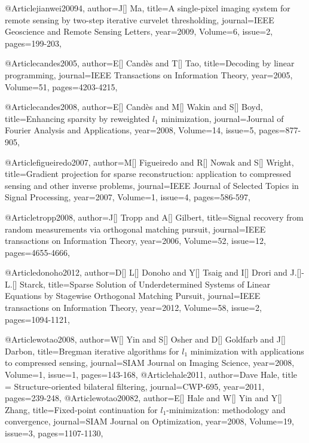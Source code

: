 @Article{jianwei20094,
  author={J[] Ma},
  title={A single-pixel imaging system for remote sensing by two-step iterative curvelet
thresholding},
  journal={IEEE Geoscience and Remote Sensing Letters},
  year=2009,
  Volume=6,
  issue=2,
  pages={199-203},
}

@Article{candes2005,
  author={E[] Cand\`{e}s and T[] Tao},
  title={Decoding by linear programming},
  journal={IEEE Transactions on Information Theory},
  year=2005,
  Volume=51,
  pages={4203-4215},
}

@Article{candes2008,
  author={E[] Cand\`{e}s and M[] Wakin and S[] Boyd},
  title={Enhancing sparsity by reweighted $l_1$ minimization},
  journal={Journal of {F}ourier Analysis and Applications},
  year=2008,
  Volume=14,
  issue=5,
  pages={877-905},
}

@Article{figueiredo2007,
  author={M[] Figueiredo and R[] Nowak and S[] Wright},
  title={Gradient projection for sparse reconstruction: application to compressed sensing and other inverse problems},
  journal={IEEE Journal of Selected Topics in Signal Processing},
  year=2007,
  Volume=1,
  issue=4,
  pages={586-597},
}


@Article{tropp2008,
  author={J[] Tropp and A[] Gilbert},
  title={Signal recovery from random measurements via orthogonal matching pursuit},
  journal={IEEE transactions on Information Theory},
  year=2006,
  Volume=52,
  issue=12,
  pages={4655-4666},
}


@Article{donoho2012,
  author={D[] L[] Donoho and Y[] Tsaig and I[] Drori and J.[]-L.[] Starck},
  title={Sparse Solution of Underdetermined Systems of Linear Equations by Stagewise Orthogonal Matching Pursuit},
  journal={IEEE transactions on Information Theory},
  year=2012,
  Volume=58,
  issue=2,
  pages={1094-1121},
}

@Article{wotao2008,
  author={W[] Yin and S[] Osher and D[] Goldfarb and J[] Darbon},
  title={Bregman iterative algorithms for $l_1$ minimization with applications to compressed sensing},
  journal={SIAM Journal on Imaging Science},
  year=2008,
  Volume=1,
  issue=1,
  pages={143-168},
}
@Article{hale2011,
  author={Dave Hale},
  title = {Structure-oriented bilateral filtering},
  journal={CWP-695},
  year=2011,
  pages={239-248},
}
@Article{wotao20082,
  author={E[] Hale and W[] Yin and Y[] Zhang},
  title={Fixed-point continuation for $l_1$-minimization: methodology and convergence},
  journal={SIAM Journal on Optimization},
  year=2008,
  Volume=19,
  issue=3,
  pages={1107-1130},
}

